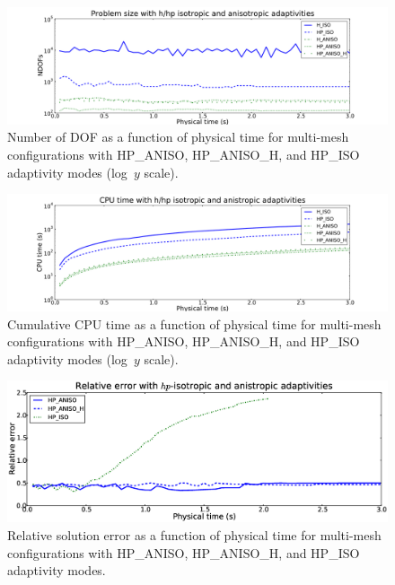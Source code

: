 \begin{figure}[!ht]
  \begin{centering}
  \includegraphics[width=\columnwidth]{isoaniso_dof}
  \caption{\label{fig:isoanisodof} Number of DOF as a function of physical time for 
  multi-mesh configurations with HP\_ANISO,
  HP\_ANISO\_H, and HP\_ISO adaptivity modes (log~$y$ scale).}
  \end{centering}
\end{figure}

\begin{figure}[!ht]
  \begin{centering}
  \includegraphics[width=\columnwidth]{isoaniso_cpu}
  \caption{\label{fig:isoanisocpu} Cumulative CPU time as a function of physical time 
  for multi-mesh configurations with HP\_ANISO,
  HP\_ANISO\_H, and HP\_ISO adaptivity modes (log~$y$ scale).}
  \end{centering}
\end{figure}

\begin{figure}[!ht]
  \begin{centering}
  \includegraphics[width=\columnwidth]{isoaniso_error}
  \caption{\label{fig:isoanisoerror} Relative solution error as a function of physical time 
  for multi-mesh configurations with HP\_ANISO,
  HP\_ANISO\_H, and HP\_ISO adaptivity modes.}
  \end{centering}
\end{figure}

